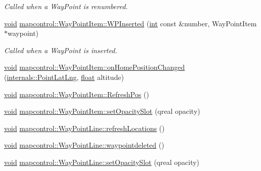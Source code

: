 \begin{DoxyCompactItemize}
\begin{DoxyCompactList}\small\item\em Called when a Way\-Point is renumbered. \end{DoxyCompactList}\item 
\hyperlink{group___u_a_v_objects_plugin_ga444cf2ff3f0ecbe028adce838d373f5c}{void} \hyperlink{group___o_p_map_widget_ga5a663a828366d996f76a646e2cad90ec}{mapcontrol\-::\-Way\-Point\-Item\-::\-W\-P\-Inserted} (\hyperlink{ioapi_8h_a787fa3cf048117ba7123753c1e74fcd6}{int} const \&number, Way\-Point\-Item $\ast$waypoint)
\begin{DoxyCompactList}\small\item\em Called when a Way\-Point is inserted. \end{DoxyCompactList}\item 
\hyperlink{group___u_a_v_objects_plugin_ga444cf2ff3f0ecbe028adce838d373f5c}{void} \hyperlink{group___o_p_map_widget_gaacddad340f4910d2ddbc811183adb83c}{mapcontrol\-::\-Way\-Point\-Item\-::on\-Home\-Position\-Changed} (\hyperlink{structinternals_1_1_point_lat_lng}{internals\-::\-Point\-Lat\-Lng}, \hyperlink{_super_l_u_support_8h_a6a1bb6ed41f44b60e7bd83b0e9945aa7}{float} altitude)
\item 
\hyperlink{group___u_a_v_objects_plugin_ga444cf2ff3f0ecbe028adce838d373f5c}{void} \hyperlink{group___o_p_map_widget_ga0fa8c77130a9df8c2057ea0078606e0f}{mapcontrol\-::\-Way\-Point\-Item\-::\-Refresh\-Pos} ()
\item 
\hyperlink{group___u_a_v_objects_plugin_ga444cf2ff3f0ecbe028adce838d373f5c}{void} \hyperlink{group___o_p_map_widget_ga31fd5de287142c02d4bd478b4aacdf52}{mapcontrol\-::\-Way\-Point\-Item\-::set\-Opacity\-Slot} (qreal opacity)
\item 
\hyperlink{group___u_a_v_objects_plugin_ga444cf2ff3f0ecbe028adce838d373f5c}{void} \hyperlink{group___o_p_map_widget_ga172c303dfa7505c919d0a6dab7cb5bc1}{mapcontrol\-::\-Way\-Point\-Line\-::refresh\-Locations} ()
\item 
\hyperlink{group___u_a_v_objects_plugin_ga444cf2ff3f0ecbe028adce838d373f5c}{void} \hyperlink{group___o_p_map_widget_ga507019eb072fcd6904290dadf39a11ef}{mapcontrol\-::\-Way\-Point\-Line\-::waypointdeleted} ()
\item 
\hyperlink{group___u_a_v_objects_plugin_ga444cf2ff3f0ecbe028adce838d373f5c}{void} \hyperlink{group___o_p_map_widget_ga352adc3521d31339f2693ad55de5e1d7}{mapcontrol\-::\-Way\-Point\-Line\-::set\-Opacity\-Slot} (qreal opacity)
\end{DoxyCompactItemize}
